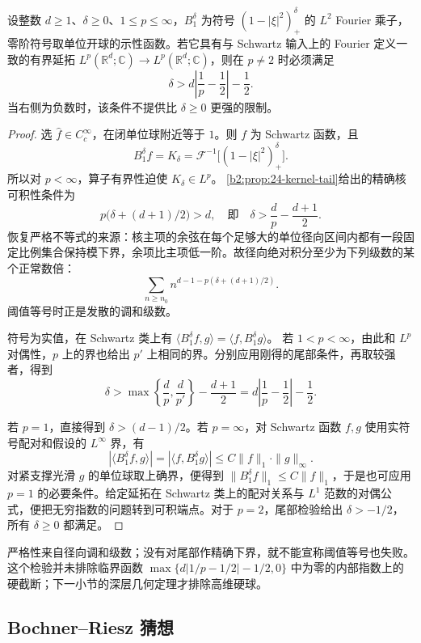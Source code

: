 \begin{proposition}[尾部必要条件]\label{b2:prop:24-necessary}
设整数 \(d\geq1\)、\(\delta\geq0\)、\(1\leq p\leq\infty\)，\(B_1^\delta\) 为符号 \((1-|\xi|^2)_+^\delta\) 的 \(L^2\) Fourier 乘子，零阶符号取单位开球的示性函数。若它具有与 Schwartz 输入上的 Fourier 定义一致的有界延拓 \(L^p(\mathbb R^d;\mathbb C)\to L^p(\mathbb R^d;\mathbb C)\)，则在 \(p\ne2\) 时必须满足
\[
 \delta>d\left|\frac1p-\frac12\right|-\frac12.
\]
当右侧为负数时，该条件不提供比 \(\delta\ge0\) 更强的限制。
\end{proposition}
\begin{proof}
选 \(\widehat f\in C_c^\infty\)，在闭单位球附近等于 \(1\)。则 \(f\) 为 Schwartz 函数，且
\[
 B_1^\delta f=K_\delta
 =\mathcal F^{-1}\bigl[(1-|\xi|^2)_+^\delta\bigr].
\]
所以对 \(p<\infty\)，算子有界性迫使 \(K_\delta\in L^p\)。
\cref{b2:prop:24-kernel-tail}给出的精确核可积性条件为
\[
 p\bigl(\delta+(d+1)/2\bigr)>d,
 \quad\text{即}\quad
 \delta>\frac dp-\frac{d+1}{2}.
\]
恢复严格不等式的来源：核主项的余弦在每个足够大的单位径向区间内都有一段固定比例集合保持模下界，余项比主项低一阶。故径向绝对积分至少为下列级数的某个正常数倍：
\[
 \sum_{n\geq n_0}n^{d-1-p(\delta+(d+1)/2)}.
\]
阈值等号时正是发散的调和级数。

符号为实值，在 Schwartz 类上有
\(\langle B_1^\delta f,g\rangle=\langle f,B_1^\delta g\rangle\)。
若 \(1<p<\infty\)，由此和 \(L^p\) 对偶性，\(p\) 上的界也给出 \(p'\) 上相同的界。分别应用刚得的尾部条件，再取较强者，得到
\[
 \delta>\max\left\{\frac dp,\frac d{p'}\right\}
 -\frac{d+1}{2}
 =d\left|\frac1p-\frac12\right|-\frac12.
\]

若 \(p=1\)，直接得到 \(\delta>(d-1)/2\)。若 \(p=\infty\)，对 Schwartz 函数 \(f,g\) 使用实符号配对和假设的 \(L^\infty\) 界，有
\[
 |\langle B_1^\delta f,g\rangle|
 =|\langle f,B_1^\delta g\rangle|
 \leq C\|f\|_1\cdot\|g\|_\infty.
\]
对紧支撑光滑 \(g\) 的单位球取上确界，便得到
\(\|B_1^\delta f\|_1\leq C\|f\|_1\)，于是也可应用 \(p=1\) 的必要条件。给定延拓在 Schwartz 类上的配对关系与 \(L^1\) 范数的对偶公式，便把无穷指数的问题转到可积端点。对于 \(p=2\)，尾部检验给出 \(\delta>-1/2\)，所有 \(\delta\geq0\) 都满足。
\end{proof}
严格性来自径向调和级数；没有对尾部作精确下界，就不能宣称阈值等号也失败。这个检验并未排除临界函数
\(\max\{d|1/p-1/2|-1/2,0\}\) 中为零的内部指数上的硬截断；下一小节的深层几何定理才排除高维硬球。

\subsection{Bochner–Riesz 猜想}
\label{b2:subsec:240303}

